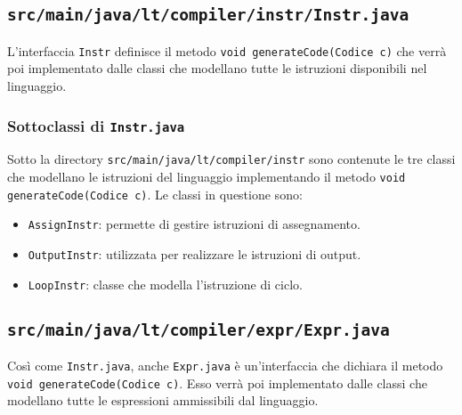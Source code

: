 \documentclass[10pt,a4paper]{article}
\begin{document}
\subsection{\texttt{src/main/java/lt/compiler/instr/Instr.java}}
L'interfaccia \texttt{Instr} definisce il metodo \texttt{void generateCode(Codice c)} che verrà poi implementato dalle classi che modellano tutte le istruzioni disponibili nel linguaggio.

\subsubsection{Sottoclassi di \texttt{Instr.java}}
Sotto la directory \texttt{src/main/java/lt/compiler/instr} sono contenute le tre classi che modellano le istruzioni del linguaggio implementando il metodo \texttt{void generateCode(Codice c)}. Le classi in questione sono:
\begin{itemize}
    \item \texttt{AssignInstr}: permette di gestire istruzioni di assegnamento.
    \item \texttt{OutputInstr}: utilizzata per realizzare le istruzioni di output.
    \item \texttt{LoopInstr}: classe che modella l'istruzione di ciclo.
\end{itemize}
\pagebreak

\subsection{\texttt{src/main/java/lt/compiler/expr/Expr.java}}
Così come \texttt{Instr.java}, anche \texttt{Expr.java} è un'interfaccia che dichiara il metodo \texttt{void generateCode(Codice c)}. Esso verrà poi implementato dalle classi che modellano tutte le espressioni ammissibili dal linguaggio.
\end{document}
